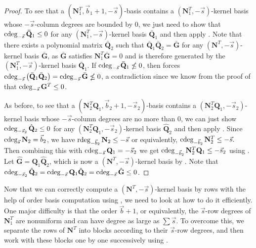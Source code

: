 \begin{proof}
To see that a $\left(\mathbf{N}_{1}^{T},\vec{b}_{1}+1,-\vec{s}\right)$-basis
contains a $\left(\mathbf{N}_{1}^{T},-\vec{s}\right)$-kernel basis
whose $-\vec{s}$-column degrees are bounded by 0, we just need to
show that $\cdeg_{-\vec{s}}\mathbf{\bar{Q}}_{1}\le0$ for any $\left(\mathbf{N}_{1}^{T},-\vec{s}\right)$-kernel
basis $\mathbf{\bar{Q}}_{1}$ and then apply .
Note that there exists a polynomial matrix $\bar{\mathbf{Q}}_{2}$
such that $\mathbf{\bar{Q}}_{1}\mathbf{\bar{Q}}_{2}=\bar{\mathbf{G}}$
for any $\left(\mathbf{N}^{T},-\vec{s}\right)$-kernel basis $\bar{\mathbf{G}}$,
as $\bar{\mathbf{G}}$ satisfies $\mathbf{N}_{1}^{T}\bar{\mathbf{G}}=0$
and is therefore generated by the $\left(\mathbf{N}_{1}^{T},-\vec{s}\right)$-kernel
basis $\bar{\mathbf{Q}}_{1}$. If $\cdeg_{-\vec{s}}\mathbf{\bar{Q}}_{1}\nleq0$,
then  forces $\cdeg_{-\vec{s}}\left(\bar{\mathbf{Q}}_{1}\bar{\mathbf{Q}}_{2}\right)=\cdeg_{-\vec{s}}\bar{\mathbf{G}}\nleq0$,
a contradiction since we know from the proof of 
that $\cdeg_{-\vec{s}}\mathbf{G}^{T}\le0$. 

As before, to see that a $\left(\mathbf{N}_{2}^{T}\mathbf{Q}_{1},\vec{b}_{2}+1,-\vec{s}_{2}\right)$-basis
contains a $\left(\mathbf{N}_{2}^{T}\mathbf{Q}_{1},-\vec{s}_{2}\right)$-kernel
basis whose $-\vec{s}$-column degrees are no more than 0, we can
just show $\cdeg_{-\vec{s}_{2}}\hat{\mathbf{Q}}_{2}\le0$ for any
$\left(\mathbf{N}_{2}^{T}\mathbf{Q}_{1},-\vec{s}_{2}\right)$-kernel
basis $\hat{\mathbf{Q}}_{2}$ and then apply .
Since $\cdeg_{\vec{s}}\mathbf{N}_{2}=\vec{b}_{2}$, we have $\rdeg_{-\vec{b}_{2}}\mathbf{N}_{2}\le-\vec{s}$
or equivalently, $\cdeg_{-\vec{b}_{2}}\mathbf{N}_{2}^{T}\le-\vec{s}.$
Then combining this with $\cdeg_{-\vec{s}}\mathbf{Q}_{1}=-\vec{s}_{2}$
we get $\cdeg_{-\vec{b}_{2}}\mathbf{N}_{2}^{T}\mathbf{Q}_{1}\le-\vec{s}_{2}$
using . Let $\hat{\mathbf{G}}=\mathbf{Q}_{1}\hat{\mathbf{Q}}_{2}$,
which is now a $\left(\mathbf{N}^{T},-\vec{s}\right)$-kernel basis
by . Note that
$\cdeg_{-\vec{s}_{2}}\hat{\mathbf{Q}}_{2}=\cdeg_{-\vec{s}}\mathbf{Q}_{1}\hat{\mathbf{Q}}_{2}=\cdeg_{-\vec{s}}\hat{\mathbf{G}}\le0$. 
\end{proof}
Now that we can correctly compute a $\left(\mathbf{N}^{T},-\vec{s}\right)$-kernel
basis by rows with the help of order basis computation using ,
we need to look at how to do it efficiently. One major difficulty
is that the order $\vec{b}+1$, or equivalently, the $\vec{s}$-row
degrees of $\mathbf{N}_{1}^{T}$ are nonuniform and can have degree
as large as $\sum\vec{s}$. To overcome this, we separate the rows
of $\mathbf{N}^{T}$ into blocks according to their $\vec{s}$-row
degrees, and then work with these blocks one by one successively using
. 

